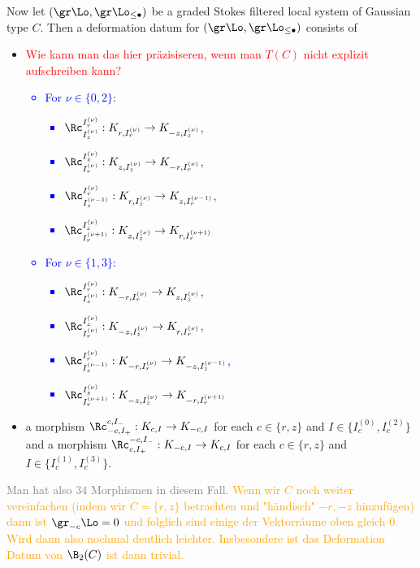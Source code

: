 \begin{ex}
\begin{itemize}
\end{itemize}
Now let $(\gr \Lo, \gr \Lo_{\leq \bullet})$ be a graded Stokes filtered local system of Gaussian type $C$. Then a deformation datum for $(\gr \Lo, \gr \Lo_{\leq \bullet})$ consists of 
\begin{itemize}
    \item \textcolor{red}{Wie kann man das hier präzisiseren, wenn man $T(C)$ nicht explizit aufschreiben kann?}
    \textcolor{blue}{
    \begin{itemize}
        \item For $\nu \in \{0,2\}$: 
        \begin{itemize}
            \item $\Rc_{I_z^{(\nu)}}^{I_r^{(\nu)}}: K_{r,I^{(\nu)}_r} \to K_{-z,I^{(\nu)}_z}$,
            \item $\Rc_{I_r^{(\nu)}}^{I_z^{(\nu)}}: K_{z,I^{(\nu)}_z} \to K_{-r,I^{(\nu)}_r}$,
            \item $\Rc_{I_z^{(\nu-1)}}^{I_r^{(\nu)}}: K_{r,I^{(\nu)}_z} \to K_{z,I^{(\nu-1)}_r}$,
            \item $\Rc_{I_r^{(\nu+1)}}^{I_z^{(\nu)}}: K_{z,I^{(\nu)}_z} \to K_{r,I^{(\nu+1)}_r}$
        \end{itemize}
        \item For $\nu \in \{1,3\}$:
        \begin{itemize}
            \item $\Rc_{I_z^{(\nu)}}^{I_r^{(\nu)}}: K_{-r,I^{(\nu)}_r} \to K_{z,I^{(\nu)}_z}$,
            \item $\Rc_{I_r^{(\nu)}}^{I_z^{(\nu)}}: K_{-z,I^{(\nu)}_z} \to K_{r,I^{(\nu)}_r}$,
            \item $\Rc_{I_z^{(\nu-1)}}^{I_r^{(\nu)}}: K_{-r,I^{(\nu)}_r} \to K_{-z,I^{(\nu-1)}_z}$,
            \item $\Rc_{I_r^{(\nu+1)}}^{I_z^{(\nu)}}: K_{-z,I^{(\nu)}_z} \to K_{-r,I^{(\nu+1)}_r}$
        \end{itemize}
    \end{itemize}}
    \item a morphism $\Rc_{-c,I_+}^{c,I_-}: K_{c,I} \to K_{-c,I}$ for each $c \in \{r,z\}$ and $I \in \{I_c^{(0)}, I_c^{(2)}\}$ and a morphism $\Rc_{c,I_+}^{-c,I_-}: K_{-c,I} \to K_{c,I}$ for each $c \in \{r,z\}$ and $I \in \{I_c^{(1)}, I_c^{(3)}\}$.
\end{itemize}
\textcolor{gray}{Man hat also $34$ Morphismen in diesem Fall.}
\textcolor{Orange}{Wenn wir $C$ noch weiter vereinfachen (indem wir $C= \{r,z\}$ betrachten und "händisch" $-r,-z$ hinzufügen) dann ist $\gr_{-c}\Lo = 0$ und folglich sind einige der Vektorräume oben gleich 0. Wird dann also nochmal deutlich leichter. Insbesondere ist das Deformation Datum von $\B_2(C)$ ist dann trivial.}

\end{ex}